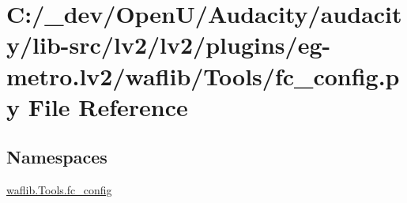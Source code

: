 \hypertarget{lv2_2plugins_2eg-metro_8lv2_2waflib_2_tools_2fc__config_8py}{}\section{C\+:/\+\_\+dev/\+Open\+U/\+Audacity/audacity/lib-\/src/lv2/lv2/plugins/eg-\/metro.lv2/waflib/\+Tools/fc\+\_\+config.py File Reference}
\label{lv2_2plugins_2eg-metro_8lv2_2waflib_2_tools_2fc__config_8py}
\subsection*{Namespaces}
\begin{DoxyCompactItemize}
\item 
 \hyperlink{namespacewaflib_1_1_tools_1_1fc__config}{waflib.\+Tools.\+fc\+\_\+config}
\end{DoxyCompactItemize}
